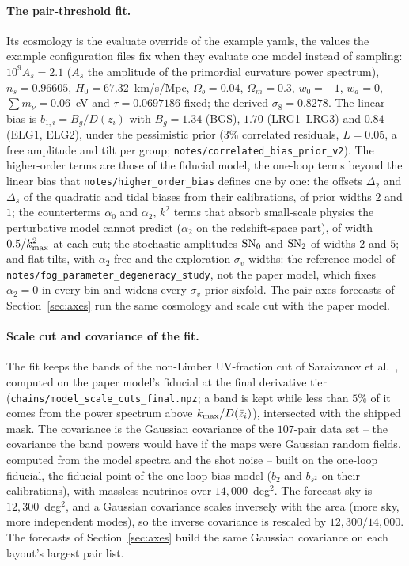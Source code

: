 \documentclass[11pt]{article}
\newcommand{\sv}{\sigma_v}
\newcommand{\us}{\_\allowbreak}
\begin{document}
\paragraph{The pair-threshold fit.}
Its cosmology is the evaluate override of the example yamls, the
values the example configuration files fix when they evaluate one
model instead of sampling:
$10^9 A_s = 2.1$ ($A_s$ the amplitude of the primordial curvature
power spectrum), $n_s = 0.96605$, $H_0 = 67.32$~km/s/Mpc,
$\Omega_b = 0.04$, $\Omega_m = 0.3$, $w_0 = -1$, $w_a = 0$,
$\sum m_\nu = 0.06$~eV and $\tau = 0.0697186$ fixed; the derived
$\sigma_8 = 0.8278$.  The linear bias is $b_{1,i} = B_g/D(\bar{z}_i)$
with $B_g = 1.34$ (BGS), $1.70$ (LRG1--LRG3) and $0.84$ (ELG1, ELG2),
under the pessimistic prior ($3\%$ correlated residuals, $L = 0.05$,
a free amplitude and tilt per group;
\texttt{notes/correlated\us bias\us prior\us v2}).  The higher-order
terms are those of the fiducial model, the one-loop terms beyond the
linear bias that \texttt{notes/higher\us order\us bias} defines one by
one: the offsets $\Delta_2$ and $\Delta_s$ of the quadratic and tidal
biases from their calibrations, of prior widths $2$ and $1$; the
counterterms
$\alpha_0$ and $\alpha_2$, $k^2$ terms that absorb small-scale physics
the perturbative model cannot predict ($\alpha_2$ on the
redshift-space part), of width $0.5/k_{\rm max}^2$ at each cut; the
stochastic amplitudes ${\rm SN}_0$ and ${\rm SN}_2$ of widths $2$ and
$5$; and flat tilts, with $\alpha_2$ free and the exploration $\sv$
widths: the reference model of
\texttt{notes/fog\us parameter\us degeneracy\us study}, not the paper
model, which fixes $\alpha_2 = 0$ in every bin and widens every $\sv$
prior sixfold.  The pair-axes forecasts of Section~\ref{sec:axes} run
the same cosmology and scale cut with the paper model.

\paragraph{Scale cut and covariance of the fit.}
The fit keeps the bands of the non-Limber UV-fraction cut of
Saraivanov et al.~\cite{Saraivanov2026}, computed on the paper
model's fiducial at the final derivative tier
(\texttt{chains/model\us scale\us cuts\us final.npz}; a band is kept
while less than $5\%$ of it comes
from the power spectrum above $k_{\rm max}/D(\bar{z}_i)$),
intersected with the shipped mask.  The covariance is the Gaussian
covariance of the $107$-pair data set -- the covariance the band
powers would have if the maps were Gaussian random fields, computed
from the model spectra and the shot noise -- built on the one-loop
fiducial, the fiducial point of the one-loop bias model
($b_2$ and $b_{s^2}$ on their calibrations), with massless neutrinos
over $14{,}000$~deg$^2$.  The forecast sky is $12{,}300$~deg$^2$, and
a Gaussian covariance scales inversely with the area (more sky, more
independent modes), so the inverse covariance is rescaled by
$12{,}300/14{,}000$.
The forecasts of Section~\ref{sec:axes} build the same Gaussian
covariance on each layout's largest pair list.
\end{document}
